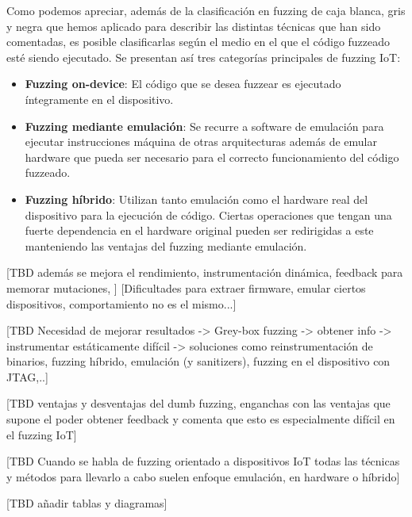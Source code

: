Como podemos apreciar, además de la clasificación en fuzzing de caja blanca, gris y negra que hemos aplicado para describir las distintas técnicas 
que han sido comentadas, es posible clasificarlas según el medio en el que el código fuzzeado esté siendo ejecutado. Se presentan así tres categorías 
principales de fuzzing IoT:
\begin{itemize}
    \item \textbf{Fuzzing on-device}: El código que se desea fuzzear es ejecutado íntegramente en el dispositivo.
    \item \textbf{Fuzzing mediante emulación}: Se recurre a software de emulación para ejecutar instrucciones máquina de otras arquitecturas además de 
    emular hardware que pueda ser necesario para el correcto funcionamiento del código fuzzeado.
    \item \textbf{Fuzzing híbrido}: Utilizan tanto emulación como el hardware real del dispositivo para la ejecución de código. Ciertas operaciones que 
    tengan una fuerte dependencia en el hardware original pueden ser redirigidas a este manteniendo las ventajas del fuzzing mediante emulación.
\end{itemize}

[TBD además se mejora el rendimiento, instrumentación dinámica, feedback para memorar mutaciones, ]
[Dificultades para extraer firmware, emular ciertos dispositivos, comportamiento no es el mismo...]

[TBD Necesidad de mejorar resultados -> Grey-box fuzzing -> obtener info -> instrumentar estáticamente difícil -> soluciones como 
reinstrumentación de binarios, fuzzing híbrido, emulación (y sanitizers), fuzzing en el dispositivo con JTAG,..]

[TBD ventajas y 
desventajas del dumb fuzzing, enganchas con las ventajas que supone el poder obtener feedback 
y comenta que esto es especialmente difícil en el fuzzing IoT]

[TBD Cuando se habla de fuzzing orientado a dispositivos IoT todas las técnicas y métodos para llevarlo 
a cabo suelen enfoque emulación, en hardware o híbrido]

[TBD añadir tablas y diagramas]